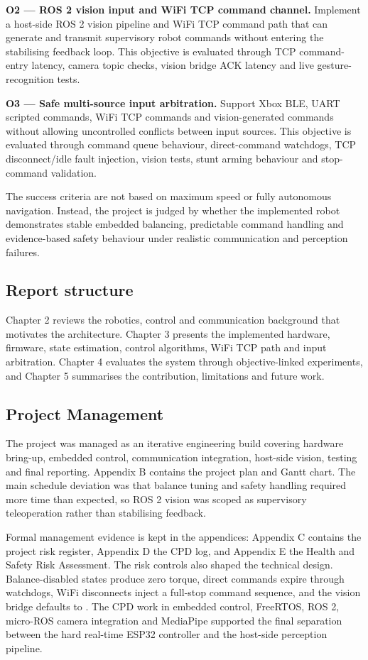 \documentclass[12pt, a4paper]{article}
\begin{document}
\textbf{O2 — ROS 2 vision input and WiFi TCP command channel.}
Implement a host-side ROS 2 vision pipeline and WiFi TCP command path that can generate and transmit supervisory robot commands without entering the stabilising feedback loop. This objective is evaluated through TCP command-entry latency, camera topic checks, vision bridge ACK latency and live gesture-recognition tests.

\textbf{O3 — Safe multi-source input arbitration.}
Support Xbox BLE, UART scripted commands, WiFi TCP commands and vision-generated commands without allowing uncontrolled conflicts between input sources. This objective is evaluated through command queue behaviour, direct-command watchdogs, TCP disconnect/idle fault injection, \texttt{} vision tests, stunt arming behaviour and stop-command validation.

The success criteria are not based on maximum speed or fully autonomous navigation. Instead, the project is judged by whether the implemented robot demonstrates stable embedded balancing, predictable command handling and evidence-based safety behaviour under realistic communication and perception failures.

\subsection{Report structure}

Chapter 2 reviews the robotics, control and communication background that motivates the architecture. Chapter 3 presents the implemented hardware, firmware, state estimation, control algorithms, WiFi TCP path and input arbitration. Chapter 4 evaluates the system through objective-linked experiments, and Chapter 5 summarises the contribution, limitations and future work.

\subsection{Project Management}

The project was managed as an iterative engineering build covering hardware bring-up, embedded control, communication integration, host-side vision, testing and final reporting. Appendix B contains the project plan and Gantt chart. The main schedule deviation was that balance tuning and safety handling required more time than expected, so ROS 2 vision was scoped as supervisory teleoperation rather than stabilising feedback.

Formal management evidence is kept in the appendices: Appendix C contains the project risk register, Appendix D the CPD log, and Appendix E the Health and Safety Risk Assessment. The risk controls also shaped the technical design. Balance-disabled states produce zero torque, direct commands expire through watchdogs, WiFi disconnects inject a full-stop command sequence, and the vision bridge defaults to \texttt{}. The CPD work in embedded control, FreeRTOS, ROS 2, micro-ROS camera integration and MediaPipe supported the final separation between the hard real-time ESP32 controller and the host-side perception pipeline.
\end{document}

